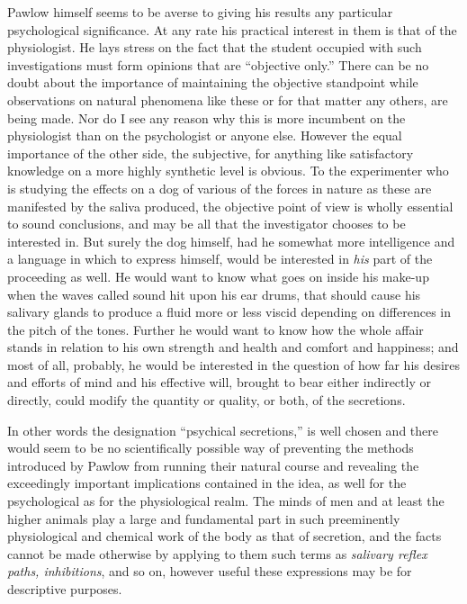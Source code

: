 \documentclass[a4paper, 11pt, oneside, polutonikogreek, english]{article}
\begin{document}
Pawlow himself seems to be averse to giving his results any particular psychological significance. At any rate his practical interest in them is that of the physiologist. He lays stress on the fact that the student occupied with such investigations must form opinions that are ``objective only.'' There can be no doubt about the importance of maintaining the objective standpoint while observations on natural phenomena like these or for that matter any others, are being made. Nor do I see any reason why this is more incumbent on the physiologist than on the psychologist or anyone else. However the equal importance of the other side, the subjective, for anything like satisfactory knowledge on a more highly synthetic level is obvious. To the experimenter who is studying the effects on a dog of various of the forces in nature as these are manifested by the saliva produced, the objective point of view is wholly essential to sound conclusions, and may be all that the investigator chooses to be interested in. But surely the dog himself, had he somewhat more intelligence and a language in which to express himself, would be interested in \emph{his} part of the proceeding as well. He would want to know what goes on inside his make-up when the waves called sound hit upon his ear drums, that should cause his salivary glands to produce a fluid more or less viscid depending on differences in the pitch of the tones. Further he would want to know how the whole affair stands in relation to his own strength and health and comfort and happiness; and most of all, probably, he would be interested in the question of how far his desires and efforts of mind and his effective will, brought to bear either indirectly or directly, could modify the quantity or quality, or both, of the secretions.

In other words the designation ``psychical secretions,'' is well chosen and there would seem to be no scientifically possible way of preventing the methods introduced by Pawlow from running their natural course and revealing the exceedingly important implications contained in the idea, as well for the psychological as for the physiological realm. The minds of men and at least the higher animals play a large and fundamental part in such preeminently physiological and chemical work of the body as that of secretion, and the facts cannot be made otherwise by applying to them such terms as \emph{salivary reflex paths, inhibitions}, and so on, however useful these expressions may be for descriptive purposes.
\end{document}
